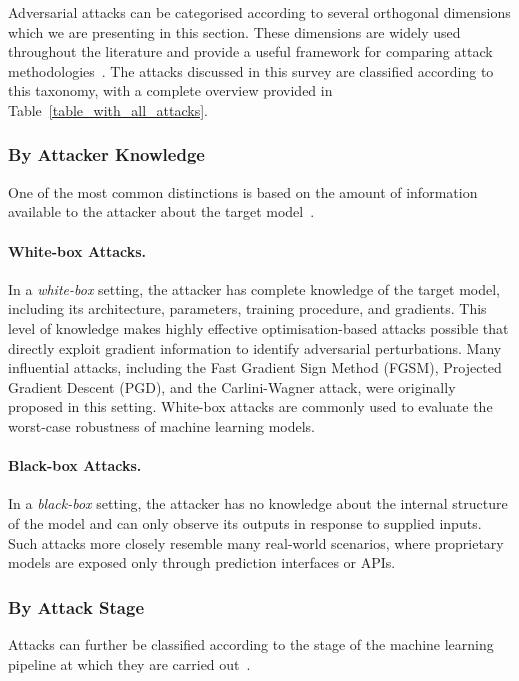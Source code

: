 \documentclass[review]{AIM_report}
\begin{document}
Adversarial attacks can be categorised according to several orthogonal dimensions which we are presenting in this section. These dimensions are widely used throughout the literature and provide a useful framework for comparing attack methodologies~\cite{pitropakis2019taxonomy,costa2024deep}. The attacks discussed in this survey are classified according to this taxonomy, with a complete overview provided in Table~\ref{table_with_all_attacks}.

\subsubsection{By Attacker Knowledge}

One of the most common distinctions is based on the amount of information available to the attacker about the target model~\cite{pitropakis2019taxonomy,costa2024deep}.

\paragraph{White-box Attacks.}
In a \textit{white-box} setting, the attacker has complete knowledge of the target model, including its architecture, parameters, training procedure, and gradients. This level of knowledge makes highly effective optimisation-based attacks possible that directly exploit gradient information to identify adversarial perturbations. Many influential attacks, including the Fast Gradient Sign Method (FGSM), Projected Gradient Descent (PGD), and the Carlini-Wagner attack, were originally proposed in this setting. White-box attacks are commonly used to evaluate the worst-case robustness of machine learning models.

\paragraph{Black-box Attacks.}
In a \textit{black-box} setting, the attacker has no knowledge about the internal structure of the model and can only observe its outputs in response to supplied inputs. Such attacks more closely resemble many real-world scenarios, where proprietary models are exposed only through prediction interfaces or APIs.

\subsubsection{By Attack Stage}

Attacks can further be classified according to the stage of the machine learning pipeline at which they are carried out~\cite{chakraborty2018adversarial,pitropakis2019taxonomy}.
\end{document}
